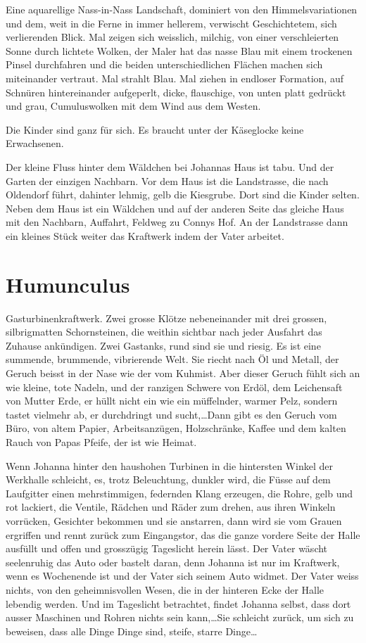 \documentclass[10pt,titlepage,a5paper]{book}
\begin{document}
Eine aquarellige Nass-in-Nass Landschaft, dominiert von den Himmelsvariationen und dem, weit in die Ferne in immer hellerem, verwischt Geschichtetem, sich verlierenden Blick. Mal zeigen sich weisslich, milchig, von einer verschleierten Sonne durch lichtete Wolken, der Maler hat das nasse Blau mit einem trockenen Pinsel durchfahren und die beiden unterschiedlichen Flächen machen sich miteinander vertraut. Mal strahlt Blau. Mal ziehen in endloser Formation, auf Schnüren hintereinander aufgeperlt, dicke, flauschige,  von unten platt gedrückt und grau, Cumuluswolken mit dem Wind aus dem Westen.

Die Kinder sind ganz für sich. Es braucht unter der Käseglocke keine Erwachsenen. 

Der kleine Fluss hinter dem Wäldchen bei Johannas Haus ist tabu. Und der Garten der einzigen Nachbarn. Vor dem Haus ist die Landstrasse, die nach Oldendorf führt, dahinter lehmig, gelb die Kiesgrube. Dort sind die Kinder selten. Neben dem Haus ist ein Wäldchen und auf der anderen Seite das gleiche Haus mit den Nachbarn, Auffahrt, Feldweg zu Connys Hof. An der Landstrasse dann ein kleines Stück weiter das Kraftwerk indem der Vater arbeitet.



\section*{Humunculus}



Gasturbinenkraftwerk. Zwei grosse Klötze nebeneinander mit drei grossen, silbrigmatten Schornsteinen, die weithin sichtbar nach jeder Ausfahrt das Zuhause ankündigen. Zwei Gastanks, rund sind sie und riesig. Es ist eine summende, brummende, vibrierende Welt. Sie riecht nach Öl und Metall, der Geruch beisst in der Nase wie der vom Kuhmist. Aber dieser Geruch fühlt sich an wie kleine, tote Nadeln, und der ranzigen Schwere von Erdöl, dem Leichensaft von Mutter Erde, er hüllt nicht ein wie ein müffelnder, warmer Pelz, sondern tastet vielmehr ab, er durchdringt und sucht,\dots Dann gibt es den Geruch vom Büro, von altem Papier, Arbeitsanzügen, Holzschränke, Kaffee und dem kalten Rauch von Papas Pfeife, der ist wie Heimat.

Wenn Johanna hinter den haushohen Turbinen in die hintersten Winkel der Werkhalle schleicht, es, trotz Beleuchtung, dunkler wird, die Füsse auf dem Laufgitter einen mehrstimmigen, federnden Klang erzeugen, die Rohre, gelb und rot lackiert, die Ventile, Rädchen und Räder zum drehen, aus ihren Winkeln vorrücken, Gesichter bekommen und sie anstarren, dann wird sie vom Grauen ergriffen und rennt zurück zum Eingangstor, das die ganze vordere Seite der Halle ausfüllt und offen und grosszügig Tageslicht herein lässt. Der Vater wäscht seelenruhig das Auto oder bastelt daran, denn Johanna ist nur im Kraftwerk, wenn es Wochenende ist und der Vater sich seinem Auto widmet. Der Vater weiss nichts, von den geheimnisvollen Wesen, die in  der hinteren Ecke der Halle lebendig werden. Und im Tageslicht betrachtet, findet Johanna selbst, dass dort ausser Maschinen und Rohren nichts sein kann,\dots Sie schleicht zurück, um sich zu beweisen, dass alle Dinge Dinge sind, steife, starre Dinge\dots
\end{document}
